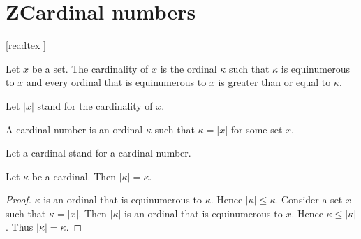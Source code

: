 \documentclass[../set-theory.tex]{subfiles}
\begin{document}
  \chapter{ZCardinal numbers}\label{chapter:cardinals}


  \begin{forthel}

    [readtex ]

  \end{forthel}


  \begin{forthel}
    \begin{definition}
      Let $x$ be a set.
      The cardinality of $x$ is the ordinal $\kappa$ such that $\kappa$ is
      equinumerous to $x$ and every ordinal that is equinumerous to $x$ is
      greater than or equal to $\kappa$.
    \end{definition}

    Let $|x|$ stand for the cardinality of $x$.
  \end{forthel}

  \begin{forthel}
    \begin{definition}
      A cardinal number is an ordinal $\kappa$ such that $\kappa = |x|$ for some
      set $x$.
    \end{definition}

    Let a cardinal stand for a cardinal number.
  \end{forthel}

  \begin{forthel}
    \begin{proposition}
      Let $\kappa$ be a cardinal.
      Then $|\kappa| = \kappa$.
    \end{proposition}
    \begin{proof}
      $\kappa$ is an ordinal that is equinumerous to $\kappa$.
      Hence $|\kappa| \leq \kappa$.
      Consider a set $x$ such that $\kappa = |x|$.
      Then $|\kappa|$ is an ordinal that is equinumerous to $x$.
      Hence $\kappa \leq |\kappa|$.
      Thus $|\kappa| = \kappa$.
    \end{proof}
  \end{forthel}
\end{document}
